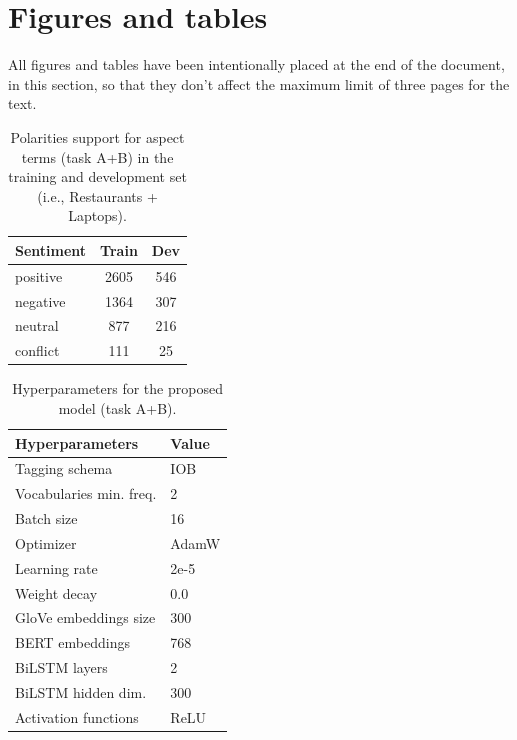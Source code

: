 \documentclass[11pt,a4paper]{article}
\begin{document}
	\clearpage
	\section{Figures and tables}
	All figures and tables have been intentionally placed at the end of the
	document, in this section, so that they don't affect the maximum limit of three
	pages for the text.
	
	\begin{table}[H]
		\centering
		\begin{tabular}{@{}lcc@{}}
			\toprule
			\textbf{Sentiment} & Train & Dev \\ \midrule
			positive           & 2605  & 546 \\
			negative           & 1364  & 307 \\
			neutral            & 877   & 216 \\
			conflict           & 111   & 25  \\ \bottomrule
		\end{tabular}
		\caption{Polarities support for aspect terms (task A+B) in the training and development set (i.e., Restaurants + Laptops).}
		\label{tab:ab_polarities_support}
	\end{table}

	\begin{table}[H]
		\centering
		\begin{tabular}{@{}ll@{}}
			\toprule
			\textbf{Hyperparameters}                  & Value \\ \midrule
			Tagging schema                            & IOB   \\
			Vocabularies min. freq.                   & 2     \\
			Batch size                                & 16    \\
			Optimizer                                 & AdamW \\
			Learning rate                             & 2e-5  \\
			Weight decay                              & 0.0   \\
			GloVe embeddings size                     & 300   \\
			BERT embeddings                           & 768   \\
			BiLSTM layers                             & 2     \\
			BiLSTM hidden dim.                        & 300   \\
			Activation functions                      & ReLU  \\ \bottomrule
		\end{tabular}
		\caption{Hyperparameters for the proposed model (task A+B).}
		\label{tab:hyperparams}
	\end{table}
	
\end{document}
